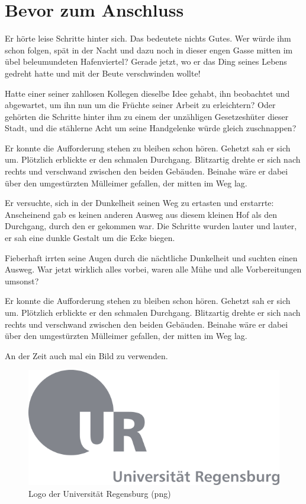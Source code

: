 \documentclass[12pt,ngerman,a4paper,DIV=11]{scrartcl}
\begin{document}
\section{Bevor zum Anschluss}\label{bevor-zum-anschluss}

Er hörte leise Schritte hinter sich. Das bedeutete nichts Gutes. Wer
würde ihm schon folgen, spät in der Nacht und dazu noch in dieser engen
Gasse mitten im übel beleumundeten Hafenviertel? Gerade jetzt, wo er das
Ding seines Lebens gedreht hatte und mit der Beute verschwinden wollte!

Hatte einer seiner zahllosen Kollegen dieselbe Idee gehabt, ihn
beobachtet und abgewartet, um ihn nun um die Früchte seiner Arbeit zu
erleichtern? Oder gehörten die Schritte hinter ihm zu einem der
unzähligen Gesetzeshüter dieser Stadt, und die stählerne Acht um seine
Handgelenke würde gleich zuschnappen?

Er konnte die Aufforderung stehen zu bleiben schon hören. Gehetzt sah er
sich um. Plötzlich erblickte er den schmalen Durchgang. Blitzartig
drehte er sich nach rechts und verschwand zwischen den beiden Gebäuden.
Beinahe wäre er dabei über den umgestürzten Mülleimer gefallen, der
mitten im Weg lag.

Er versuchte, sich in der Dunkelheit seinen Weg zu ertasten und
erstarrte: Anscheinend gab es keinen anderen Ausweg aus diesem kleinen
Hof als den Durchgang, durch den er gekommen war. Die Schritte wurden
lauter und lauter, er sah eine dunkle Gestalt um die Ecke biegen.

Fieberhaft irrten seine Augen durch die nächtliche Dunkelheit und
suchten einen Ausweg. War jetzt wirklich alles vorbei, waren alle Mühe
und alle Vorbereitungen umsonst?

Er konnte die Aufforderung stehen zu bleiben schon hören. Gehetzt sah er
sich um. Plötzlich erblickte er den schmalen Durchgang. Blitzartig
drehte er sich nach rechts und verschwand zwischen den beiden Gebäuden.
Beinahe wäre er dabei über den umgestürzten Mülleimer gefallen, der
mitten im Weg lag.



An der Zeit auch mal ein Bild zu verwenden.

\begin{figure}[htbp]
\centering
\includegraphics{Bilder/ur-logo.png}
\caption{Logo der Universität Regensburg (png)}
\end{figure}
\end{document}
